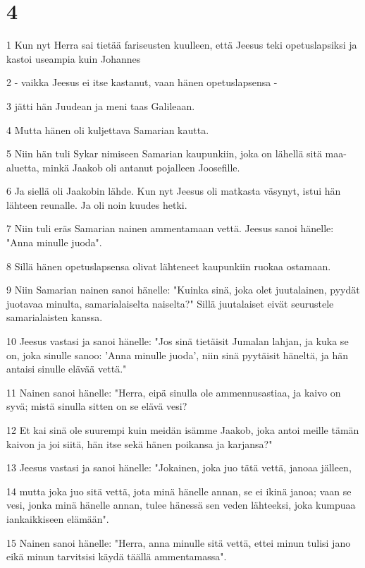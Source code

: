 \chapter{4}

\par 1 Kun nyt Herra sai tietää fariseusten kuulleen, että Jeesus teki opetuslapsiksi ja kastoi useampia kuin Johannes
\par 2 - vaikka Jeesus ei itse kastanut, vaan hänen opetuslapsensa -
\par 3 jätti hän Juudean ja meni taas Galileaan.
\par 4 Mutta hänen oli kuljettava Samarian kautta.
\par 5 Niin hän tuli Sykar nimiseen Samarian kaupunkiin, joka on lähellä sitä maa-aluetta, minkä Jaakob oli antanut pojalleen Joosefille.
\par 6 Ja siellä oli Jaakobin lähde. Kun nyt Jeesus oli matkasta väsynyt, istui hän lähteen reunalle. Ja oli noin kuudes hetki.
\par 7 Niin tuli eräs Samarian nainen ammentamaan vettä. Jeesus sanoi hänelle: "Anna minulle juoda".
\par 8 Sillä hänen opetuslapsensa olivat lähteneet kaupunkiin ruokaa ostamaan.
\par 9 Niin Samarian nainen sanoi hänelle: "Kuinka sinä, joka olet juutalainen, pyydät juotavaa minulta, samarialaiselta naiselta?" Sillä juutalaiset eivät seurustele samarialaisten kanssa.
\par 10 Jeesus vastasi ja sanoi hänelle: "Jos sinä tietäisit Jumalan lahjan, ja kuka se on, joka sinulle sanoo: 'Anna minulle juoda', niin sinä pyytäisit häneltä, ja hän antaisi sinulle elävää vettä."
\par 11 Nainen sanoi hänelle: "Herra, eipä sinulla ole ammennusastiaa, ja kaivo on syvä; mistä sinulla sitten on se elävä vesi?
\par 12 Et kai sinä ole suurempi kuin meidän isämme Jaakob, joka antoi meille tämän kaivon ja joi siitä, hän itse sekä hänen poikansa ja karjansa?"
\par 13 Jeesus vastasi ja sanoi hänelle: "Jokainen, joka juo tätä vettä, janoaa jälleen,
\par 14 mutta joka juo sitä vettä, jota minä hänelle annan, se ei ikinä janoa; vaan se vesi, jonka minä hänelle annan, tulee hänessä sen veden lähteeksi, joka kumpuaa iankaikkiseen elämään".
\par 15 Nainen sanoi hänelle: "Herra, anna minulle sitä vettä, ettei minun tulisi jano eikä minun tarvitsisi käydä täällä ammentamassa".
